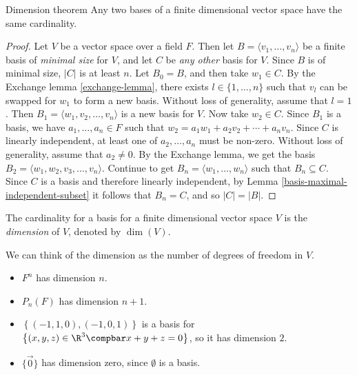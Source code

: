 \documentclass[12pt]{article}
\begin{document}
\begin{thm}{Dimension theorem}\label{dimension-theorem}\proofbreak
    Any two bases of a finite dimensional vector space have the same cardinality.
\end{thm}

\begin{proof}
    Let $V$ be a vector space over a field $F$. Then let $B = \langle v_1, \ldots, v_n \rangle$ be a finite basis of \emph{minimal size} for $V$, and let $C$ be \emph{any other} basis for $V$. Since $B$ is of minimal size, $|C|$ is at least $n$. Let $B_0 = B$, and then take $w_1 \in C$. By the Exchange lemma \ref{exchange-lemma}, there exists $l \in \{1, \ldots, n\}$ such that $v_l$ can be swapped for $w_1$ to form a new basis. Without loss of generality, assume that $l = 1$. Then $B_1 = \langle w_1, v_2, \ldots, v_n \rangle$ is a new basis for $V$. Now take $w_2 \in C$. Since $B_1$ is a basis, we have $a_1, \ldots, a_n \in F$ such that $w_2 = a_1w_1 + a_2v_2 + \cdots + a_nv_n$. Since $C$ is linearly independent, at least one of $a_2, \ldots, a_n$  must be non-zero. Without loss of generality, assume that $a_2 \neq 0$. By the Exchange lemma, we get the basis $B_2 = \langle w_1, w_2, v_3, \ldots, v_n\rangle$. Continue to get $B_n = \langle w_1, \ldots, w_n \rangle$ such that $B_n \subseteq C$. Since $C$ is a basis and therefore linearly independent, by Lemma \ref{basis-maximal-independent-subset} it follows that $B_n = C$, and so $|C| = |B|$.
\end{proof}

\begin{defn}
    The cardinality for a basis for a finite dimensional vector space $V$ is the \emph{dimension} of $V$, denoted by $\dim(V)$.
\end{defn}

\begin{rmk}
    We can think of the dimension as the number of degrees of freedom in $V$.
\end{rmk}

\begin{exmp}\proofbreak
    \begin{itemize}
        \item $F^n$ has dimension $n$.
        \item $P_n(F)$ has dimension $n+1$.
        \item $\left\{(-1, 1, 0), (-1, 0, 1)\right\}$ is a basis for $\left\{\left(x, y, z\right) \in \R^3 \compbar x + y + z = 0 \right\}$, so it has dimension $2$.
        \item $\{\vec{0}\}$ has dimension zero, since $\emptyset$ is a basis.
    \end{itemize}
\end{exmp}
\end{document}
